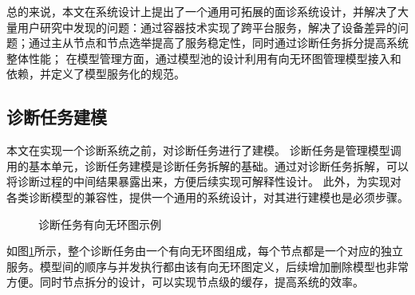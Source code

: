 总的来说，本文在系统设计上提出了一个通用可拓展的面诊系统设计，并解决了大量用户研究中发现的问题：通过容器技术实现了跨平台服务，解决了设备差异的问题；通过主从节点和节点选举提高了服务稳定性，同时通过诊断任务拆分提高系统整体性能；
在模型管理方面，通过模型池的设计利用有向无环图管理模型接入和依赖，并定义了模型服务化的规范。

\subsection{诊断任务建模}
本文在实现一个诊断系统之前，对诊断任务进行了建模。
诊断任务是管理模型调用的基本单元，诊断任务建模是诊断任务拆解的基础。通过对诊断任务拆解，可以将诊断过程的中间结果暴露出来，方便后续实现可解释性设计。
此外，为实现对各类诊断模型的兼容性，提供一个通用的系统设计，对其进行建模也是必须步骤。

\begin{figure}
    \centering
    \caption{诊断任务有向无环图示例}
    \label{fig:model_dag}
\end{figure}

如图\ref{fig:model_dag}所示，整个诊断任务由一个有向无环图组成，每个节点都是一个对应的独立服务。模型间的顺序与并发执行都由该有向无环图定义，后续增加删除模型也非常方便。同时节点拆分的设计，可以实现节点级的缓存，提高系统的效率。

